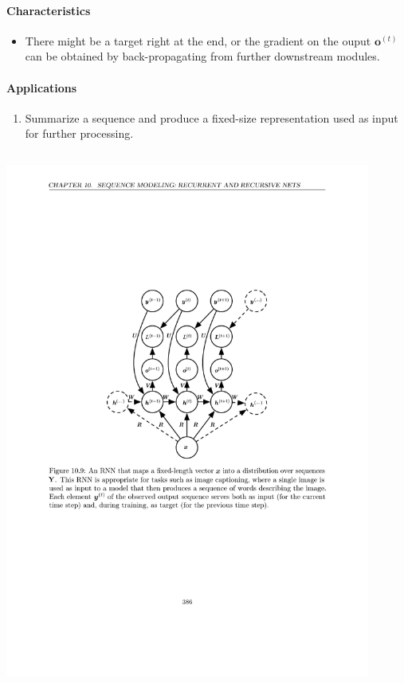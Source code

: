 \documentclass[12pt, a4paper]{article}
\newcommand{\egvo}[1]{\boldsymbol{o}^{(#1)}}
\begin{document}
\paragraph{Characteristics}
\begin{itemize}
    \item There might be a target right at the end, or the gradient on the ouput $\egvo{t}$ can be obtained by back-propagating from further downstream modules.
\end{itemize}
\paragraph{Applications}
\begin{enumerate}
    \item Summarize a sequence and produce a fixed-size representation used as input for further processing.
\end{enumerate}


\subsection{}
\begin{center}
    \includegraphics[width=0.9\textwidth]{../imgs/RNN_4.pdf}
\end{center}
\end{document}
